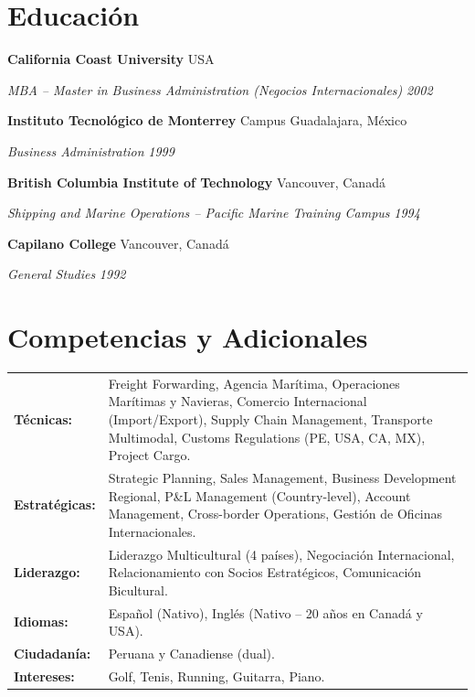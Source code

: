 \documentclass[11pt,letterpaper]{article}
\newcommand{\entry}[4]{%
  \noindent\textbf{#1} \hfill #2 \par\nopagebreak
  \textit{#3} \hfill \textit{#4} \par\nopagebreak
}
\begin{document}
\section{Educación}

\entry{California Coast University}{USA}{MBA -- Master in Business Administration (Negocios Internacionales)}{2002}
\vspace{0.3em}

\entry{Instituto Tecnológico de Monterrey}{Campus Guadalajara, México}{Business Administration}{1999}
\vspace{0.3em}

\entry{British Columbia Institute of Technology}{Vancouver, Canadá}{Shipping and Marine Operations -- Pacific Marine Training Campus}{1994}
\vspace{0.3em}

\entry{Capilano College}{Vancouver, Canadá}{General Studies}{1992}
\vspace{0.3em}

\section{Competencias y Adicionales}

\begin{tabularx}{\textwidth}{@{}l X@{}}
\textbf{Técnicas:} & Freight Forwarding, Agencia Marítima, Operaciones Marítimas y Navieras, Comercio Internacional (Import/Export), Supply Chain Management, Transporte Multimodal, Customs Regulations (PE, USA, CA, MX), Project Cargo. \\
\textbf{Estratégicas:} & Strategic Planning, Sales Management, Business Development Regional, P\&L Management (Country-level), Account Management, Cross-border Operations, Gestión de Oficinas Internacionales. \\
\textbf{Liderazgo:} & Liderazgo Multicultural (4 países), Negociación Internacional, Relacionamiento con Socios Estratégicos, Comunicación Bicultural. \\
\textbf{Idiomas:} & Español (Nativo), Inglés (Nativo -- 20 años en Canadá y USA). \\
\textbf{Ciudadanía:} & Peruana y Canadiense (dual). \\
\textbf{Intereses:} & Golf, Tenis, Running, Guitarra, Piano. \\
\end{tabularx}
\end{document}
